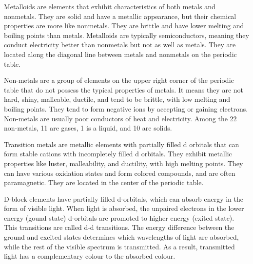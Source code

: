 \documentclass[12pt]{article}
\begin{document}
Metalloids are elements that exhibit characteristics of both metals and nonmetals. They are solid and have a metallic appearance, but their chemical properties are more like nonmetals. They are brittle and have lower melting and boiling points than metals. Metalloids are typically semiconductors, meaning they conduct electricity better than nonmetals but not as well as metals. They are located along the diagonal line between metals and nonmetals on the periodic table.

Non-metals are a group of elements on the upper right corner of the periodic table that do not possess the typical properties of metals. It means they are not hard, shiny, malleable, ductile, and tend to be brittle, with low melting and boiling points. They tend to form negative ions by accepting or gaining electrons. Non-metals are usually poor conductors of heat and electricity. Among the 22 non-metals, 11 are gases, 1 is a liquid, and 10 are solids.


Transition metals are metallic elements with partially filled d orbitals that can form stable cations with incompletely filled d orbitals. They exhibit metallic properties like luster, malleability, and ductility, with high melting points. They can have various oxidation states and form colored compounds, and are often paramagnetic. They are located in the center of the periodic table.

D-block elements have partially filled d-orbitals, which can absorb energy in the form of visible light. When light is absorbed, the unpaired electrons in the lower energy (gound state) d-orbitals are promoted to higher energy (exited state). This transitions are called d-d transitions. The energy difference between the ground and excited states determines which wavelengths of light are absorbed, while the rest of the visible spectrum is transmitted. As a result, transmitted light has a complementary colour to the absorbed colour.

\pagebreak
{}
\end{document}
